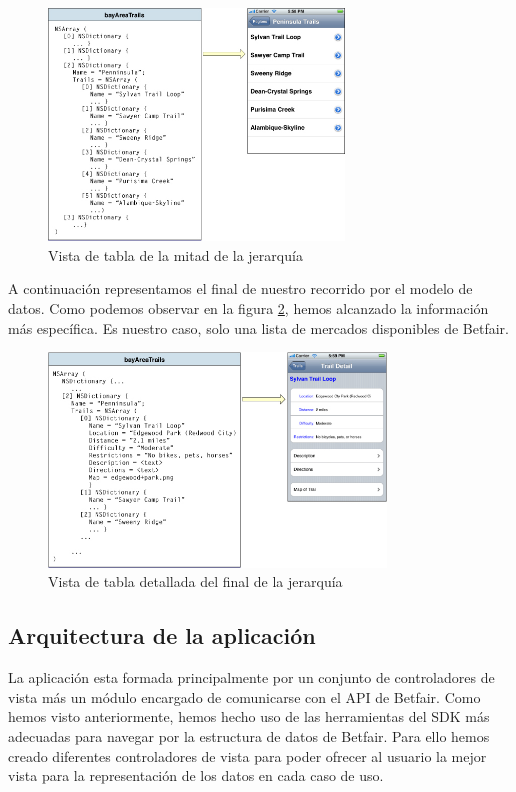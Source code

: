 \begin{figure}[ht!]
  \centering
    \includegraphics[width=0.7\textwidth]{./images/tv_datamodel_middle.jpg}
  \caption{Vista de tabla de la mitad de la jerarquía}
  \label{fig:table-view-middle}
\end{figure} 

 A continuación representamos el final de nuestro recorrido por el modelo de datos. Como podemos observar en la figura \ref{fig:detail-table-view}, hemos alcanzado la información más específica. Es nuestro caso, solo una lista de mercados disponibles de Betfair.

\begin{figure}[ht!]
  \centering
    \includegraphics[width=0.8\textwidth]{./images/tv_datamodel_detail.jpg}
  \caption{Vista de tabla detallada del final de la jerarquía }
  \label{fig:detail-table-view}
\end{figure} 

\subsection{Arquitectura de la aplicación}	
   
   La aplicación esta formada principalmente por un conjunto de controladores de vista más un módulo encargado de comunicarse con el API de Betfair. Como hemos visto anteriormente, hemos hecho uso de las herramientas del SDK más adecuadas para navegar por la estructura de datos de Betfair. Para ello hemos creado diferentes controladores de vista para poder ofrecer al usuario la mejor vista para la representación de los datos en cada caso de uso.%
   
